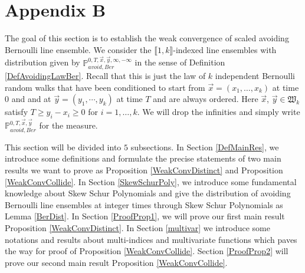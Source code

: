 %
\section{Appendix B} \label{Section9}

The goal of this section is to establish the weak convergence of scaled avoiding Bernoulli line ensemble. We consider the $\llbracket 1,k\rrbracket$-indexed line ensembles with distribution given by $\mathbb{P}^{0,T,\vec{x},\vec{y},\infty,-\infty}_{avoid,Ber}$ in the sense of Definition \ref{DefAvoidingLawBer}. Recall that this is just the law of $k$ independent Bernoulli random walks that have been conditioned to start from $\vec{x}=(x_{1},\dots,x_{k})$ at time $0$ and and at $\vec{y}=(y_1,\cdots,y_{k})$ at time $T$ and are always ordered. Here $\vec{x}$, $\vec{y}\in\mathfrak{W}_{k}$ satisfy $T\geq y_{i}-x_{i}\geq 0$ for $i=1,\dots,k$. We will drop the infinities and simply write $\mathbb{P}^{0,T,\vec{x},\vec{y}}_{avoid,Ber}$ for the measure.

This section will be divided into $5$ subsections. In Section \ref{DefMainRes}, we introduce some definitions and formulate the precise statements of two main results we want to prove as Proposition \ref{WeakConvDistinct} and Proposition \ref{WeakConvCollide}. In Section \ref{SkewSchurPoly}, we introduce some fundamental knowledge about Skew Schur Polynomials and give the distribution of avoiding Bernoulli line ensembles at integer times through Skew Schur Polynomials as Lemma \ref{BerDist}. In Section \ref{ProofProp1}, we will prove our first main result Proposition \ref{WeakConvDistinct}. In Section \ref{multivar} we introduce some notations and results about multi-indices and multivariate functions which paves the way for proof of Proposition \ref{WeakConvCollide}. Section \ref{ProofProp2} will prove our second main result Proposition \ref{WeakConvCollide}.

